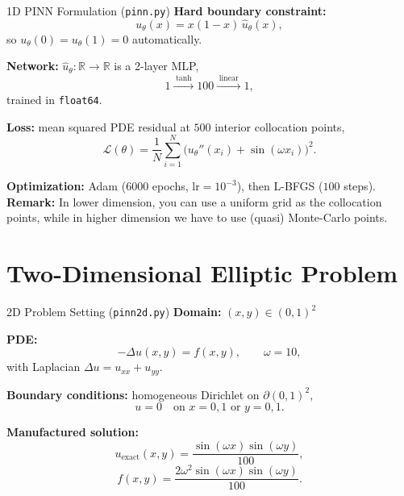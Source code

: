 \documentclass[10pt]{beamer}
\begin{document}
\begin{frame}{1D PINN Formulation (\texttt{pinn.py})}
	\textbf{Hard boundary constraint:}
	\[
		u_\theta(x) = x(1-x)\,\widehat{u}_\theta(x),
	\]
	so $u_\theta(0)=u_\theta(1)=0$ automatically.

	\vspace{0.4em}
	\textbf{Network:} $\widehat{u}_\theta \colon \mathbb{R}\to\mathbb{R}$ is a 2-layer MLP,
	\[
		1 \xrightarrow{\;\tanh\;} 100 \xrightarrow{\;\mathrm{linear}\;} 1,
	\]
	trained in \texttt{float64}.

	\vspace{0.4em}
	\textbf{Loss:} mean squared PDE residual at $500$ interior collocation points,
	\[
		\mathcal{L}(\theta)
		= \frac{1}{N}\sum_{i=1}^{N}
		\bigl(u_\theta''(x_i) + \sin(\omega x_i)\bigr)^2.
	\]

	\vspace{0.4em}
	\textbf{Optimization:} Adam ($6000$ epochs, $\mathrm{lr}=10^{-3}$), then L-BFGS ($100$ steps).
	\textbf{Remark:} In lower dimension, you can use a uniform grid as the collocation points, while in higher dimension we have to use (quasi) Monte-Carlo points. 
\end{frame}

\section{Two-Dimensional Elliptic Problem}

\begin{frame}{2D Problem Setting (\texttt{pinn2d.py})}
	\textbf{Domain:} $(x,y) \in (0,1)^2$

	\vspace{0.4em}
	\textbf{PDE:}
	\[
		-\Delta u(x,y) = f(x,y), \qquad \omega = 10,
	\]
	with Laplacian $\Delta u = u_{xx} + u_{yy}$.

	\vspace{0.4em}
	\textbf{Boundary conditions:} homogeneous Dirichlet on $\partial(0,1)^2$,
	\[
		u = 0 \quad \text{on } x=0,1 \text{ or } y=0,1.
	\]

	\vspace{0.4em}
	\textbf{Manufactured solution:}
	\[
		u_{\mathrm{exact}}(x,y)
		= \frac{\sin(\omega x)\sin(\omega y)}{100},
	\]
	\[
		f(x,y)
		= \frac{2\omega^2\sin(\omega x)\sin(\omega y)}{100}.
	\]
\end{frame}
\end{document}

